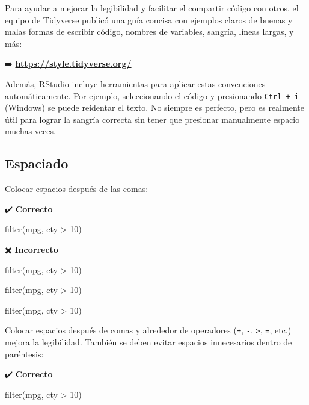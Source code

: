 \documentclass[
  spanish,
  letterpaper,
  DIV=11,
  numbers=noendperiod]{scrreprt}
\newenvironment{Shaded}{\begin{snugshade}}{\end{snugshade}}
\newcommand{\DecValTok}[1]{\textcolor[rgb]{0.68,0.00,0.00}{#1}}
\newcommand{\FunctionTok}[1]{\textcolor[rgb]{0.28,0.35,0.67}{#1}}
\newcommand{\NormalTok}[1]{\textcolor[rgb]{0.00,0.23,0.31}{#1}}
\newcommand{\SpecialCharTok}[1]{\textcolor[rgb]{0.37,0.37,0.37}{#1}}
\begin{document}
Para ayudar a mejorar la legibilidad y facilitar el compartir código con
otros, el equipo de Tidyverse publicó una guía concisa con ejemplos
claros de buenas y malas formas de escribir código, nombres de
variables, sangría, líneas largas, y más:

➡️
\href{https://style.tidyverse.org/}{\textbf{https://style.tidyverse.org/}}

Además, RStudio incluye herramientas para aplicar estas convenciones
automáticamente. Por ejemplo, seleccionando el código y presionando
\texttt{Ctrl\ +\ i} (Windows) se puede reidentar el texto. No siempre es
perfecto, pero es realmente útil para lograr la sangría correcta sin
tener que presionar manualmente espacio muchas veces.

\subsection{Espaciado}\label{espaciado}

Colocar espacios después de las comas:

✔️ \textbf{Correcto}

\begin{Shaded}
\begin{Highlighting}[]
\FunctionTok{filter}\NormalTok{(mpg, cty }\SpecialCharTok{\textgreater{}} \DecValTok{10}\NormalTok{)}
\end{Highlighting}
\end{Shaded}

✖️ \textbf{Incorrecto}

\begin{Shaded}
\begin{Highlighting}[]
\FunctionTok{filter}\NormalTok{(mpg, cty }\SpecialCharTok{\textgreater{}} \DecValTok{10}\NormalTok{)}

\FunctionTok{filter}\NormalTok{(mpg, cty }\SpecialCharTok{\textgreater{}} \DecValTok{10}\NormalTok{)}

\FunctionTok{filter}\NormalTok{(mpg, cty }\SpecialCharTok{\textgreater{}} \DecValTok{10}\NormalTok{)}
\end{Highlighting}
\end{Shaded}

Colocar espacios después de comas y alrededor de operadores (\texttt{+},
\texttt{-}, \texttt{\textgreater{}}, \texttt{=}, etc.) mejora la
legibilidad. También se deben evitar espacios innecesarios dentro de
paréntesis:

✔️ \textbf{Correcto}

\begin{Shaded}
\begin{Highlighting}[]
\FunctionTok{filter}\NormalTok{(mpg, cty }\SpecialCharTok{\textgreater{}} \DecValTok{10}\NormalTok{)}
\end{Highlighting}
\end{Shaded}
\end{document}
